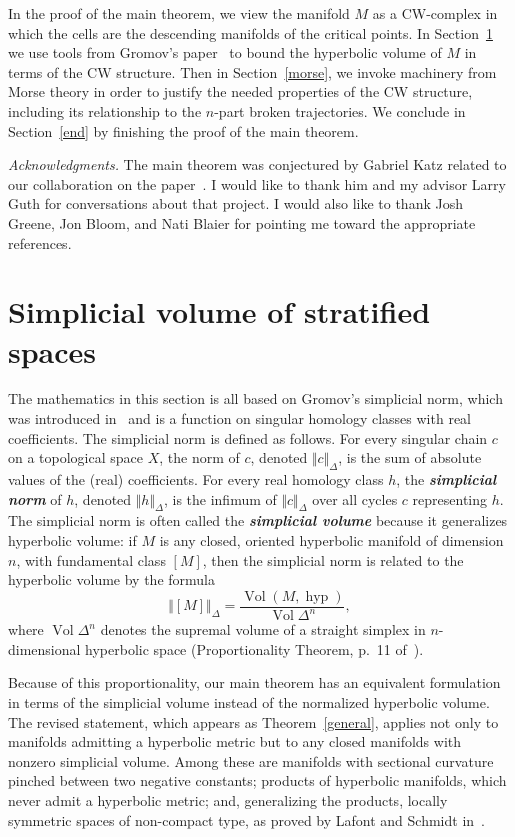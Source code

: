 \documentclass[psamsfonts]{amsart}
\theoremstyle{remark}
\DeclareMathOperator{\Vol}{Vol}
\DeclareMathOperator{\hyp}{hyp}
\begin{document}
In the proof of the main theorem, we view the manifold $M$ as a CW-complex in which the cells are the descending manifolds of the critical points.  In Section~\ref{simplicial} we use tools from Gromov's paper~\cite{Gromov09} to bound the hyperbolic volume of $M$ in terms of the CW structure.  Then in Section~\ref{morse}, we invoke machinery from Morse theory in order to justify the needed properties of the CW structure, including its relationship to the $n$-part broken trajectories.  We conclude in Section~\ref{end} by finishing the proof of the main theorem.

\emph{Acknowledgments.}  The main theorem was conjectured by Gabriel Katz related to our collaboration on the paper~\cite{Alpert15}.  I would like to thank him and my advisor Larry Guth for conversations about that project.  I would also like to thank Josh Greene, Jon Bloom, and Nati Blaier for pointing me toward the appropriate references.

\section{Simplicial volume of stratified spaces}\label{simplicial}

The mathematics in this section is all based on Gromov's simplicial norm, which was introduced in~\cite{Gromov82} and is a function on singular homology classes with real coefficients.  The simplicial norm is defined as follows.  For every singular chain $c$ on a topological space $X$, the norm of $c$, denoted $\Vert c \Vert_\Delta$, is the sum of absolute values of the (real) coefficients.  For every real homology class $h$, the \textbf{\emph{simplicial norm}} of $h$, denoted $\Vert h \Vert_{\Delta}$, is the infimum of $\Vert c \Vert_\Delta$ over all cycles $c$ representing $h$.  The simplicial norm is often called the \textbf{\emph{simplicial volume}} because it generalizes hyperbolic volume: if $M$ is any closed, oriented hyperbolic manifold of dimension $n$, with fundamental class $[M]$, then the simplicial norm is related to the hyperbolic volume by the formula
\[\Vert [M] \Vert_{\Delta} = \frac{\Vol(M, \hyp)}{\Vol \Delta^n},\]
where $\Vol \Delta^n$ denotes the supremal volume of a straight simplex in $n$-dimensional hyperbolic space (Proportionality Theorem, p.~11 of~\cite{Gromov82}).

Because of this proportionality, our main theorem has an equivalent formulation in terms of the simplicial volume instead of the normalized hyperbolic volume.  The revised statement, which appears as Theorem~\ref{general}, applies not only to manifolds admitting a hyperbolic metric but to any closed manifolds with nonzero simplicial volume.  Among these are manifolds with sectional curvature pinched between two negative constants; products of hyperbolic manifolds, which never admit a hyperbolic metric; and, generalizing the products, locally symmetric spaces of non-compact type, as proved by Lafont and Schmidt in~\cite{Lafont06}.
\end{document}
